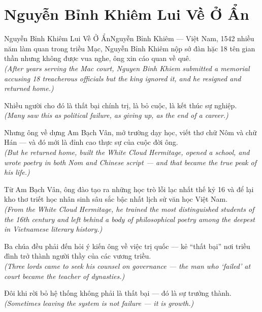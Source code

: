 \section{Nguyễn Bỉnh Khiêm Lui Về Ở Ẩn}
\begin{truyen}{Nguyễn Bỉnh Khiêm Lui Về Ở Ẩn}{Nguyễn Bỉnh Khiêm --- Việt Nam, 1542}
 nhiều năm làm quan trong triều Mạc, Nguyễn Bỉnh Khiêm nộp sớ đàn hặc 18 tên gian thần nhưng không được vua nghe, ông xin cáo quan về quê.\\[4pt]
\textit{(After years serving the Mac court, Nguyen Binh Khiem submitted a memorial accusing 18 treacherous officials but the king ignored it, and he resigned and returned home.)}

Nhiều người cho đó là thất bại chính trị, là bỏ cuộc, là kết thúc sự nghiệp.\\[4pt]
\textit{(Many saw this as political failure, as giving up, as the end of a career.)}

Nhưng ông về dựng Am Bạch Vân, mở trường dạy học, viết thơ chữ Nôm và chữ Hán --- và đó mới là đỉnh cao thực sự của cuộc đời ông.\\[4pt]
\textit{(But he returned home, built the White Cloud Hermitage, opened a school, and wrote poetry in both Nom and Chinese script --- and that became the true peak of his life.)}

Từ Am Bạch Vân, ông đào tạo ra những học trò lỗi lạc nhất thế kỷ 16 và để lại kho thơ triết học nhân sinh sâu sắc bậc nhất lịch sử văn học Việt Nam.\\[4pt]
\textit{(From the White Cloud Hermitage, he trained the most distinguished students of the 16th century and left behind a body of philosophical poetry among the deepest in Vietnamese literary history.)}

Ba chúa đều phải đến hỏi ý kiến ông về việc trị quốc --- kẻ ``thất bại'' nơi triều đình trở thành người thầy của các vương triều.\\[4pt]
\textit{(Three lords came to seek his counsel on governance --- the man who `failed' at court became the teacher of dynasties.)}

\end{truyen}
\begin{baihoc}
  Đôi khi rời bỏ hệ thống không phải là thất bại --- đó là sự trưởng thành.\\[4pt]
  \textit{(Sometimes leaving the system is not failure --- it is growth.)}
\end{baihoc}

